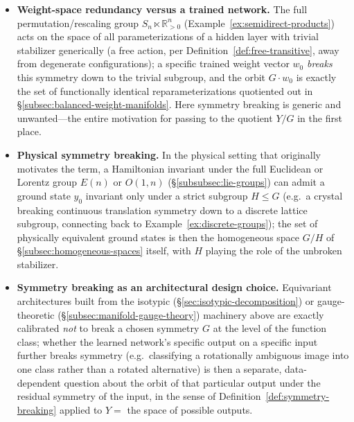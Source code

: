 \documentclass[mathematics,review,submit,moreauthors]{Definitions/mdpi}
\begin{document}
\begin{Example}\label{ex:symmetry-breaking}
\phantom{u}
\begin{itemize}
    \item \textbf{Weight-space redundancy versus a trained network.} The
    full permutation/rescaling group $S_n \ltimes \mathbb{R}_{>0}^n$
    (Example~\ref{ex:semidirect-products}) acts on the space of all
    parameterizations of a hidden layer with trivial stabilizer generically
    (a free action, per Definition~\ref{def:free-transitive}, away from
    degenerate configurations); a specific trained weight vector $w_0$
    \emph{breaks} this symmetry down to the trivial subgroup, and the orbit
    $G \cdot w_0$ is exactly the set of functionally identical
    reparameterizations quotiented out in
    \S\ref{subsec:balanced-weight-manifolds}. Here symmetry breaking is
    generic and unwanted---the entire motivation for passing to the
    quotient $Y/G$ in the first place.
    \item \textbf{Physical symmetry breaking.} In the physical setting that
    originally motivates the term, a Hamiltonian invariant under the full
    Euclidean or Lorentz group $E(n)$ or $O(1,n)$
    (\S\ref{subsubsec:lie-groups}) can admit a ground state $y_0$ invariant
    only under a strict subgroup $H \leq G$ (e.g.\ a crystal breaking
    continuous translation symmetry down to a discrete lattice subgroup,
    connecting back to Example~\ref{ex:discrete-groups}); the set of
    physically equivalent ground states is then the homogeneous space
    $G/H$ of \S\ref{subsec:homogeneous-spaces} itself, with $H$ playing the
    role of the unbroken stabilizer.
    \item \textbf{Symmetry breaking as an architectural design choice.}
    Equivariant architectures built from the isotypic
    (\S\ref{sec:isotypic-decomposition}) or gauge-theoretic
    (\S\ref{subsec:manifold-gauge-theory}) machinery above are exactly
    calibrated \emph{not} to break a chosen symmetry $G$ at the level of the
    function class; whether the learned network's specific output on a
    specific input further breaks symmetry (e.g.\ classifying a
    rotationally ambiguous image into one class rather than a rotated
    alternative) is then a separate, data-dependent question about the
    orbit of that particular output under the residual symmetry of the
    input, in the sense of Definition~\ref{def:symmetry-breaking} applied
    to $Y = $ the space of possible outputs.
\end{itemize}
\end{Example}
\end{document}
